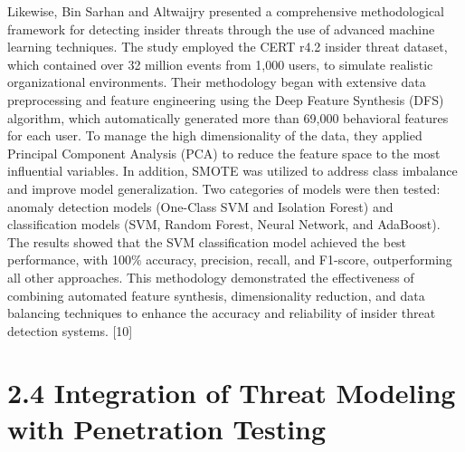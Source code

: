 \documentclass[12pt,a4paper]{report}
\begin{document}
Likewise, Bin Sarhan and Altwaijry presented a comprehensive methodological framework for detecting insider threats through the use of advanced machine learning techniques. The study employed the CERT r4.2 insider threat dataset, which contained over 32 million events from 1,000 users, to simulate realistic organizational environments. Their methodology began with extensive data preprocessing and feature engineering using the Deep Feature Synthesis (DFS) algorithm, which automatically generated more than 69,000 behavioral features for each user. To manage the high dimensionality of the data, they applied Principal Component Analysis (PCA) to reduce the feature space to the most influential variables. In addition, SMOTE was utilized to address class imbalance and improve model generalization.
 Two categories of models were then tested: anomaly detection models (One-Class SVM and Isolation Forest) and classification models (SVM, Random Forest, Neural Network, and AdaBoost). The results showed that the SVM classification model achieved the best performance, with 100\% accuracy, precision, recall, and F1-score, outperforming all other approaches. This methodology demonstrated the effectiveness of combining automated feature synthesis, dimensionality reduction, and data balancing techniques to enhance the accuracy and reliability of insider threat detection systems. [10]

\section{2.4 Integration of Threat Modeling with Penetration Testing}
\end{document}
